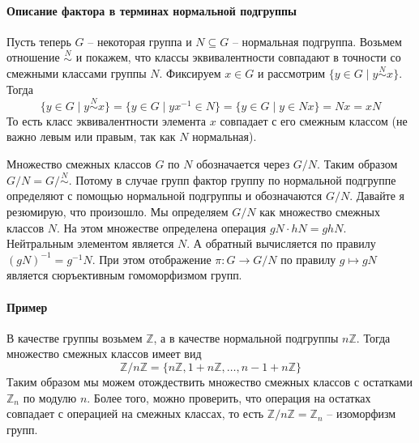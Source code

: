 \paragraph{Описание фактора в терминах нормальной подгруппы}

Пусть теперь $G$ -- некоторая группа и $N\subseteq G$ -- нормальная подгруппа.
Возьмем отношение $\stackrel{N}{\sim}$ и покажем, что классы эквивалентности совпадают в точности со смежными классами группы $N$.
Фиксируем $x\in G$ и рассмотрим $\{y \in G\mid y \stackrel{N}{\sim} x\}$.
Тогда
\[
\{y \in G\mid y \stackrel{N}{\sim} x\} = \{y\in G \mid yx^{-1}\in N\} = \{y\in G\mid y \in N x\} = N x = x N
\]
То есть класс эквивалентности элемента $x$ совпадает с его смежным классом (не важно левым или правым, так как $N$ нормальная).

Множество смежных классов $G$ по $N$ обозначается через $G/N$.
Таким образом $G/N = G/{\stackrel{N}{\sim}}$.
Потому в случае групп фактор группу по нормальной подгруппе определяют с помощью нормальной подгруппы и обозначаются $G/N$.
Давайте я резюмирую, что произошло.
Мы определяем $G/N$ как множество смежных классов $N$.
На этом множестве определена операция $gN \cdot hN = gh N$.
Нейтральным элементом является $N$.
А обратный вычисляется по правилу $(gN)^{-1} = g^{-1}N$.
При этом отображение $\pi \colon G\to G/N$ по правилу $g \mapsto gN$ является сюръективным гомоморфизмом групп.

\paragraph{Пример}

В качестве группы возьмем $\mathbb Z$, а в качестве нормальной подгруппы $n\mathbb Z$.
Тогда множество смежных классов имеет вид
\[
\mathbb Z / n\mathbb Z = \{n\mathbb Z, 1 + n \mathbb Z, \ldots, n-1 + n\mathbb Z\}
\]
Таким образом мы можем отождествить множество смежных классов с остатками $\mathbb Z_n$ по модулю $n$.
Более того, можно проверить, что операция на остатках совпадает с операцией на смежных классах, то есть $\mathbb Z/ n \mathbb Z = \mathbb Z_n$ -- изоморфизм групп.